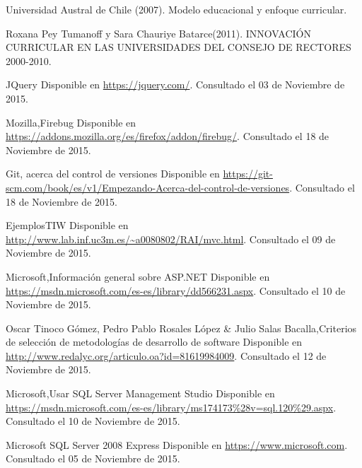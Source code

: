 \begin{spacing}{1.0}
\begin{thebibliography}{99}  

\newblock Universidad Austral de Chile (2007).
\newblock Modelo educacional y enfoque curricular. 

\newblock Roxana Pey Tumanoff y Sara Chauriye Batarce(2011).
\newblock INNOVACIÓN CURRICULAR EN LAS UNIVERSIDADES DEL CONSEJO DE RECTORES 2000-2010. 


\newblock JQuery
\newblock Disponible en \url{https://jquery.com/}.
\newblock Consultado el 03 de Noviembre de 2015.

\newblock Mozilla,Firebug
\newblock Disponible en \url{https://addons.mozilla.org/es/firefox/addon/firebug/}.
\newblock Consultado el 18 de Noviembre de 2015.

\newblock Git,	acerca del control de versiones 
\newblock Disponible en \url{https://git-scm.com/book/es/v1/Empezando-Acerca-del-control-de-versiones}.
\newblock Consultado el 18 de Noviembre de 2015.

\newblock EjemplosTIW
\newblock Disponible en \url{http://www.lab.inf.uc3m.es/~a0080802/RAI/mvc.html}.
\newblock Consultado el 09 de Noviembre de 2015.

\newblock Microsoft,Información general sobre ASP.NET
\newblock Disponible en \url{https://msdn.microsoft.com/es-es/library/dd566231.aspx}.
\newblock Consultado el 10 de Noviembre de 2015.


\newblock  Oscar Tinoco Gómez, Pedro Pablo Rosales López \& Julio Salas Bacalla,Criterios de selección de metodologías de desarrollo de software
\newblock Disponible en \url{http://www.redalyc.org/articulo.oa?id=81619984009}.
\newblock Consultado el 12 de Noviembre de 2015.


\newblock Microsoft,Usar SQL Server Management Studio
\newblock Disponible en \url{https://msdn.microsoft.com/es-es/library/ms174173%28v=sql.120%29.aspx}.
\newblock Consultado el 10 de Noviembre de 2015.

\newblock Microsoft SQL Server 2008 Express 
\newblock Disponible en \url{https://www.microsoft.com}.
\newblock Consultado el 05 de Noviembre de 2015.


\end{thebibliography}
\end{spacing}
